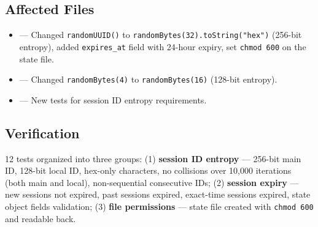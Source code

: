 \subsection*{Affected Files}
\begin{itemize}
    \item {} --- Changed \texttt{randomUUID()} to \texttt{randomBytes(32).toString("hex")} (256-bit entropy), added \texttt{expires\_at} field with 24-hour expiry, set \texttt{chmod 600} on the state file.
    \item {} --- Changed \texttt{randomBytes(4)} to \texttt{randomBytes(16)} (128-bit entropy).
    \item {} --- New tests for session ID entropy requirements.
\end{itemize}

\subsection*{Verification}
12 tests organized into three groups: (1) \textbf{session ID entropy} --- 256-bit main ID, 128-bit local ID, hex-only characters, no collisions over 10,000 iterations (both main and local), non-sequential consecutive IDs; (2) \textbf{session expiry} --- new sessions not expired, past sessions expired, exact-time sessions expired, state object fields validation; (3) \textbf{file permissions} --- state file created with \texttt{chmod 600} and readable back.
